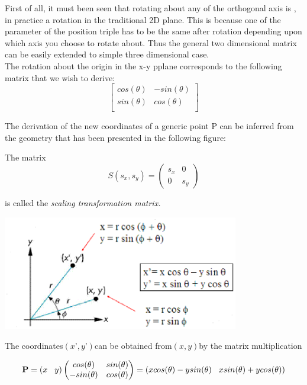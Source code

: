 \documentclass[12pt]{report}
\begin{document}
First of all, it must been seen that rotating about any of the orthogonal axis is , in practice a rotation in the traditional 2D plane. This is because one of the parameter of the position triple has to be the same after rotation depending upon which axis you choose to rotate about. Thus the general two dimensional matrix can be easily extended to simple three dimensional case.
\vspace{0.3cm}
\\The rotation about the origin in the x-y pplane corresponds to the following matrix that we wish to derive:
\[ \begin{bmatrix}
cos(\theta)  &  -sin(\theta) \\
sin(\theta)  &  cos(\theta) \\
\end{bmatrix}\]

\hspace{1cm} The derivation of the new coordinates of a generic point P can be inferred from the geometry that has been presented in the following figure:
\\
\vspace{0.2cm}

The matrix
\[ S(s_{x},s_{y}) = \begin{pmatrix}
s_{x} & 0 \\
0 & s_{y}
\end{pmatrix}  \]

is called the \textit{scaling transformation matrix.}
\begin{center} 
  \includegraphics[height=5cm]{scalingCh1.eps}
\end{center}

The coordinates$ (x’ , y’ ) $can be obtained from$ (x, y) $by the matrix multiplication

\[ \textbf{P} = (x \hspace{0.3cm} y) \begin{pmatrix}
cos(\theta) & sin(\theta) \\
-sin(\theta) & cos(\theta)
\end{pmatrix} = (x cos(\theta) - y sin(\theta) \hspace{0.3cm} x sin(\theta) + y cos(\theta) ) \]
\end{document}
